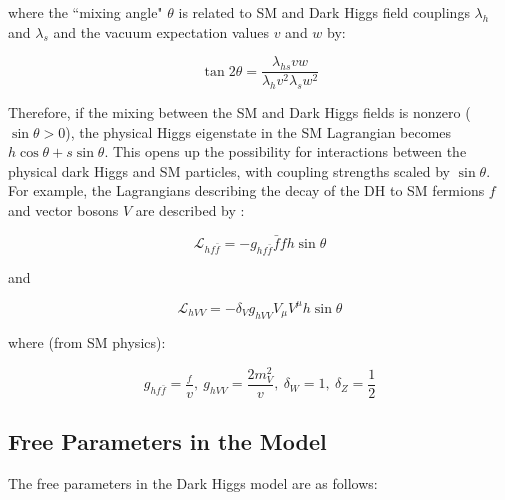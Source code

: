 \noindent where the ``mixing angle" \(\theta\) is related to SM and Dark Higgs field couplings \(\lambda_h\) and \(\lambda_s\) and the vacuum expectation values \(v\) and \(w\) by:

\begin{equation}
\label{eq:higgs_mixing_angle}
\tan2\theta = \frac{\lambda_{hs}vw}{\lambda_hv^2  \lambda_sw^2}
\end{equation}

Therefore, if the mixing between the SM and Dark Higgs fields is nonzero (\(\sin\theta > 0\)), the physical Higgs eigenstate in the SM Lagrangian becomes \(h\cos\theta + s\sin\theta\). This opens up the possibility for interactions between the physical dark Higgs and SM particles, with coupling strengths scaled by \(\sin\theta\). For example, the Lagrangians describing the decay of the DH to SM fermions \(f\) and vector bosons \(V\) are described by \cite{Duerr_2016, PDG_2018}:  

\begin{equation}
\mathcal{L}_{hf\bar{f}} = -g_{hf\bar{f}}\bar{f}f h\sin\theta 
\end{equation}

\noindent and

\begin{equation}
\mathcal{L}_{hVV} = -\delta_V g_{hVV}V_\mu V^\mu h\sin\theta 
\end{equation}

\noindent where (from SM physics):

\begin{equation}
g_{hf\bar{f}} = \frac{_f}{v}, ~ g_{hVV} = \frac{2m_V^2}{v}, ~ \delta_W = 1, ~ \delta_Z = \frac{1}{2}
\end{equation}

\subsection{Free Parameters in the Model}
\label{sec:dh_model_free_parameters}

The free parameters in the Dark Higgs model are as follows:

